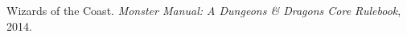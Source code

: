 
\begin{thebibliography}{9}

Wizards of the Coast. 
\textit{Monster Manual: A Dungeons \& Dragons Core Rulebook}, 2014.

\end{thebibliography}

